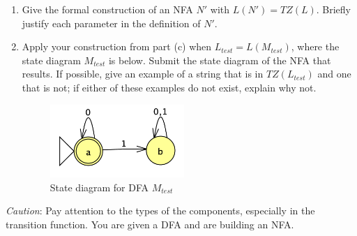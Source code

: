 \documentclass[12pt, oneside]{article}
\begin{document}
\begin{enumerate}
\begin{enumerate}
\item Give the formal construction of an NFA $N'$ with $L(N') = TZ(L)$.  Briefly justify 
each parameter in the definition of  $N'$. 
\item Apply your construction from part (c)  when $L_{test} = L(M_{test})$, where the 
state diagram $M_{test}$ is below.  Submit the state diagram of the NFA that results.
If possible, give an example of a string that is in $TZ(L_{test})$ and one that is not; if either of these examples
do not exist, explain why not.
\begin{figure}[h]
   \centering
   \includegraphics[width=2in]{../../resources/machines/MtestDFA.png}
   \caption{State diagram for DFA $M_{test}$}
\end{figure}
\end{enumerate}
{\it Caution}: Pay attention to the types of the components, especially
in the transition function.  You are given a DFA and are building an NFA.
\end{enumerate}
\end{document}
